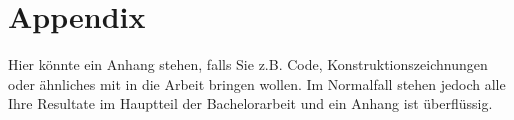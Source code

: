 \chapter{Appendix}

Hier könnte ein Anhang stehen, falls Sie z.B. Code, Konstruktionszeichnungen oder ähnliches mit in die Arbeit bringen wollen. Im Normalfall stehen jedoch alle Ihre Resultate im Hauptteil der Bachelorarbeit und ein Anhang ist überflüssig.
